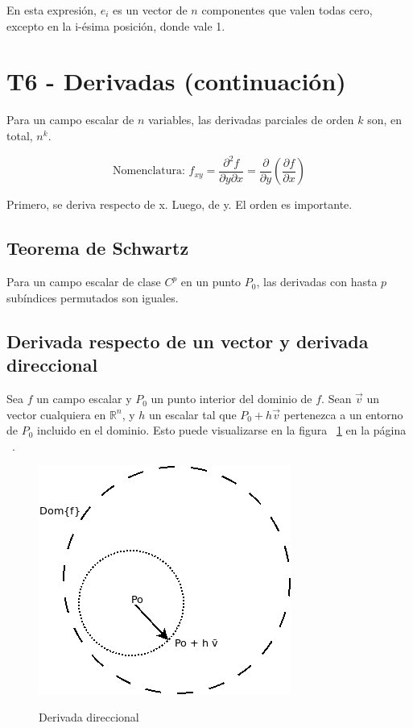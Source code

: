 \documentclass{article}
\renewcommand{\Bbb}{\mathbb}
\begin{document}
En esta expresión, $e_i$ es un vector de $n$ componentes que valen todas cero, excepto en la i-ésima posición, donde vale 1.

\section{T6 - Derivadas (continuación)}

Para un campo escalar de $n$ variables, las derivadas parciales de orden $k$ son, en total, $n^k$.

\begin{equation}
\text{Nomenclatura:  } f_{xy} = \frac{\partial^2 f}{\partial y \partial x } = \frac{\partial}{\partial y} \left( \frac{\partial f}{\partial x} \right)
\end{equation}

Primero, se deriva respecto de x. Luego, de y. El orden es importante.

\subsection{Teorema de Schwartz}

Para un campo escalar de clase $C^p$ en un punto $P_0$, las derivadas con hasta $p$ subíndices permutados son iguales.

\subsection{Derivada respecto de un vector y derivada direccional}

Sea $f$ un campo escalar y $P_0$ un punto interior del dominio de $f$. Sean $\overrightarrow{v}$ un vector cualquiera en $\Bbb R^n$, y $h$ un escalar tal que $P_0 + h \overrightarrow{v}$ pertenezca a un entorno de $P_0$ incluido en el dominio. Esto puede visualizarse en la figura ~\ref{fig:deriv_direcc} en la página ~\pageref{fig:deriv_direcc}.

\begin{figure}[t]
\centering
\caption{Derivada direccional}
\includegraphics[scale=0.5]{img/teo_fig004_deriv_direcc.png}
\label{fig:deriv_direcc}
\end{figure}
\end{document}
